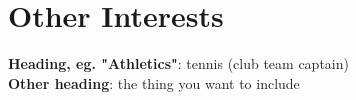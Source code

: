 \documentclass[letterpaper,11pt]{article}
\begin{document}
\section{Other Interests}
\begin{itemize}[leftmargin=0.15in, label={}]
    \normalsize{\item{
     \textbf{Heading, eg. "Athletics"}{: {tennis (club team captain)} } \\
      \textbf{Other heading}{: {the thing you want to include} } \\
    }}    
 \end{itemize}

\fi
\end{document}
